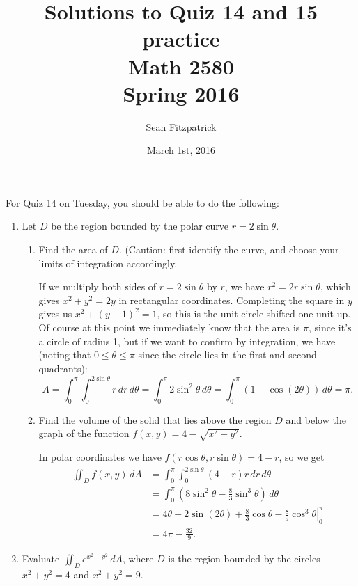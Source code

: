 \documentclass[letterpaper,12pt]{article}
\title{Solutions to Quiz 14 and 15 practice\\Math 2580\\Spring 2016}
\author{Sean Fitzpatrick}
\date{March 1st, 2016}
\newcommand{\di}{\displaystyle}
\begin{document}
 \maketitle

For Quiz 14 on Tuesday, you should be able to do the following:
\begin{enumerate}
 \item Let $D$ be the region bounded by the polar curve $r=2\sin\theta$.
 \begin{enumerate}
 \item Find the area of $D$. (Caution: first identify the curve, and choose your limits of integration accordingly.

\bigskip

If we multiply both sides of $r=2\sin\theta$ by $r$, we have $r^2=2r\sin\theta$, which gives $x^2+y^2=2y$ in rectangular coordinates. Completing the square in $y$ gives us $x^2+(y-1)^2=1$, so this is the unit circle shifted one unit up. Of course at this point we immediately know that the area is $\pi$, since it's a circle of radius 1, but if we want to confirm by integration, we have (noting that $0\leq \theta\leq \pi$ since the circle lies in the first and second quadrants):
\[
 A = \int_0^\pi\int_0^{2\sin\theta}r\,dr\,d\theta = \int_0^\pi 2\sin^2\theta\,d\theta = \int_0^\pi (1-\cos(2\theta))\,d\theta = \pi.
\]

 \item Find the volume of the solid that lies above the region $D$ and below the graph of the function $f(x,y) = 4-\sqrt{x^2+y^2}$.

\bigskip

In polar coordinates we have $f(r\cos\theta,r\sin\theta) = 4-r$, so we get
\begin{align*}
\iint_D f(x,y)\,dA & = \int_0^\pi\int_0^{2\sin\theta}(4-r)r\,dr\,d\theta\\
& = \int_0^\pi (8\sin^2\theta - \frac{8}{3}\sin^3\theta)\,d\theta\\
& = \left. 4\theta-2\sin(2\theta)+\frac{8}{3}\cos\theta-\frac{8}{9}\cos^3\theta \right|_0^\pi\\
& = 4\pi-\frac{32}{9}.
\end{align*}



 \end{enumerate}
 \item Evaluate $\di \iint_D e^{x^2+y^2}\,dA$, where $D$ is the region bounded by the circles $x^2+y^2=4$ and $x^2+y^2=9$.

\bigskip



\end{enumerate}
\end{document}
